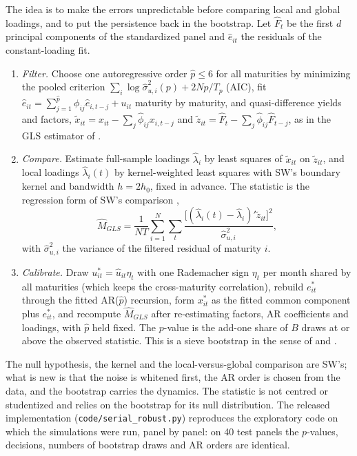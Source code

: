 \documentclass[11pt]{article}
\begin{document}
The idea is to make the errors unpredictable before comparing local and global loadings, and to put the persistence back in the bootstrap. Let $\hat F_t$ be the first $d$ principal components of the standardized panel and $\hat e_{it}$ the residuals of the constant-loading fit.
\begin{enumerate}
\item \emph{Filter.} Choose one autoregressive order $\hat p\le 6$ for all maturities by minimizing the pooled criterion $\sum_i\log\hat\sigma^2_{u,i}(p)+2Np/T_p$ (AIC), fit $\hat e_{it}=\sum_{j=1}^{\hat p}\phi_{ij}\hat e_{i,t-j}+u_{it}$ maturity by maturity, and quasi-difference yields and factors, $\tilde x_{it}=x_{it}-\sum_j\hat\phi_{ij}x_{i,t-j}$ and $\tilde z_{it}=\hat F_t-\sum_j\hat\phi_{ij}\hat F_{t-j}$, as in the GLS estimator of \citet{BreitungTenhofen2011}.
\item \emph{Compare.} Estimate full-sample loadings $\hat\lambda_i$ by least squares of $\tilde x_{it}$ on $\tilde z_{it}$, and local loadings $\hat\lambda_i(t)$ by kernel-weighted least squares with SW's boundary kernel and bandwidth $h=2h_0$, fixed in advance. The statistic is the regression form of SW's comparison \citep{SuWang2020},
\[
\hat M_{GLS}=\frac{1}{NT}\sum_{i=1}^N\sum_{t}\frac{\big[(\hat\lambda_i(t)-\hat\lambda_i)'\tilde z_{it}\big]^2}{\hat\sigma^2_{u,i}},
\]
with $\hat\sigma^2_{u,i}$ the variance of the filtered residual of maturity $i$.
\item \emph{Calibrate.} Draw $u^*_{it}=\hat u_{it}\eta_t$ with one Rademacher sign $\eta_t$ per month shared by all maturities (which keeps the cross-maturity correlation), rebuild $e^*_{it}$ through the fitted AR($\hat p$) recursion, form $x^*_{it}$ as the fitted common component plus $e^*_{it}$, and recompute $\hat M_{GLS}$ after re-estimating factors, AR coefficients and loadings, with $\hat p$ held fixed. The $p$-value is the add-one share of $B$ draws at or above the observed statistic. This is a sieve bootstrap in the sense of \citet{Kreiss1992} and \citet{Buhlmann1997}.
\end{enumerate}
The null hypothesis, the kernel and the local-versus-global comparison are SW's; what is new is that the noise is whitened first, the AR order is chosen from the data, and the bootstrap carries the dynamics. The statistic is not centred or studentized and relies on the bootstrap for its null distribution. The released implementation (\texttt{code/serial\_robust.py}) reproduces the exploratory code on which the simulations were run, panel by panel: on 40 test panels the $p$-values, decisions, numbers of bootstrap draws and AR orders are identical.
\end{document}
